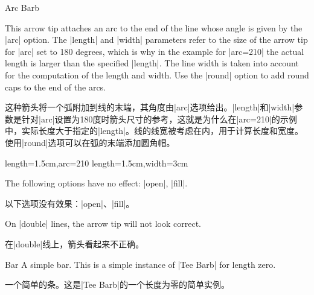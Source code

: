 \begin{arrowtip}{Arc Barb}{
    This arrow tip attaches an arc to the end of the line whose angle is given
    by the |arc| option. The |length| and |width| parameters refer to the size
    of the arrow tip for |arc| set to 180 degrees, which is why in the example
    for |arc=210| the actual length is larger than the specified |length|. The
    line width is taken into account for the computation  of the length and
    width. Use the |round| option to add round caps to the end of the arcs.

    这种箭头将一个弧附加到线的末端，其角度由|arc|选项给出。|length|和|width|参数是针对|arc|设置为180度时箭头尺寸的参考，这就是为什么在|arc=210|的示例中，实际长度大于指定的|length|。线的线宽被考虑在内，用于计算长度和宽度。使用|round|选项可以在弧的末端添加圆角帽。
}%
{length=1.5cm,arc=210}%
{length=1.5cm,width=3cm}

    \begin{arrowexamples}
        \arrowexample[]
        \arrowexampledup[sep]
        \arrowexampledupdot[sep]
        \arrowexample[arc=120]
        \arrowexample[arc=270]
        \arrowexample[length=2pt]
        \arrowexample[length=2pt,width=5pt]
        \arrowexample[line width=2pt]
        \arrowexample[reversed]
        \arrowexample[round]
        \arrowexample[slant=.3]
        \arrowexample[left]
        \arrowexample[right]
        \arrowexample[red]
    \end{arrowexamples}
    The following options have no effect: |open|, |fill|.

    以下选项没有效果：|open|、|fill|。



    On |double| lines, the arrow tip will not look correct.

    在|double|线上，箭头看起来不正确。


\end{arrowtip}

\begin{arrowtipsimple}{Bar}
    A simple bar. This is a simple instance of |Tee Barb| for length zero.

    一个简单的条。这是|Tee Barb|的一个长度为零的简单实例。


\end{arrowtipsimple}

